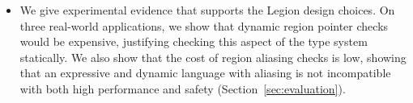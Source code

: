 \begin{itemize}
\item We give experimental evidence that supports the Legion design choices.  On three
  real-world applications, we show that dynamic region pointer checks
  would be expensive, justifying checking this aspect of the type
  system statically.  We also show that the cost of region aliasing
  checks is low, showing that an expressive and dynamic
  language with aliasing is not incompatible with both high
  performance and safety (Section~\ref{sec:evaluation}).

\end{itemize}















